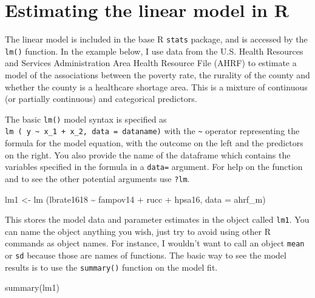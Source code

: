 \documentclass[
  letterpaper,
  DIV=11,
  numbers=noendperiod]{scrreprt}
\newenvironment{Shaded}{\begin{snugshade}}{\end{snugshade}}
\newcommand{\AttributeTok}[1]{\textcolor[rgb]{0.40,0.45,0.13}{#1}}
\newcommand{\FunctionTok}[1]{\textcolor[rgb]{0.28,0.35,0.67}{#1}}
\newcommand{\NormalTok}[1]{\textcolor[rgb]{0.00,0.23,0.31}{#1}}
\newcommand{\OtherTok}[1]{\textcolor[rgb]{0.00,0.23,0.31}{#1}}
\newcommand{\SpecialCharTok}[1]{\textcolor[rgb]{0.37,0.37,0.37}{#1}}
\begin{document}
\hypertarget{estimating-the-linear-model-in-r}{%
\section{Estimating the linear model in
R}\label{estimating-the-linear-model-in-r}}

The linear model is included in the base R \texttt{stats} package, and
is accessed by the \texttt{lm()} function. In the example below, I use
data from the U.S. Health Resources and Services Administration Area
Health Resource File (AHRF) to estimate a model of the associations
between the poverty rate, the rurality of the county and whether the
county is a healthcare shortage area. This is a mixture of continuous
(or partially continuous) and categorical predictors.

The basic \texttt{lm()} model syntax is specified as
\texttt{lm\ (\ y\ \textasciitilde{}\ x\_1\ +\ x\_2,\ data\ =\ dataname)}
with the \texttt{\textasciitilde{}} operator representing the formula
for the model equation, with the outcome on the left and the predictors
on the right. You also provide the name of the dataframe which contains
the variables specified in the formula in a \texttt{data=} argument. For
help on the function and to see the other potential arguments use
\texttt{?lm}.

\begin{Shaded}
\begin{Highlighting}[]
\NormalTok{lm1 }\OtherTok{\textless{}{-}} \FunctionTok{lm}\NormalTok{ (lbrate1618 }\SpecialCharTok{\textasciitilde{}}\NormalTok{  fampov14 }\SpecialCharTok{+}\NormalTok{ rucc }\SpecialCharTok{+}\NormalTok{ hpsa16, }\AttributeTok{data =}\NormalTok{ ahrf\_m)}
\end{Highlighting}
\end{Shaded}

This stores the model data and parameter estimates in the object called
\texttt{lm1}. You can name the object anything you wish, just try to
avoid using other R commands as object names. For instance, I wouldn't
want to call an object \texttt{mean} or \texttt{sd} because those are
names of functions. The basic way to see the model results is to use the
\texttt{summary()} function on the model fit.

\begin{Shaded}
\begin{Highlighting}[]
\FunctionTok{summary}\NormalTok{(lm1)}
\end{Highlighting}
\end{Shaded}
\end{document}
